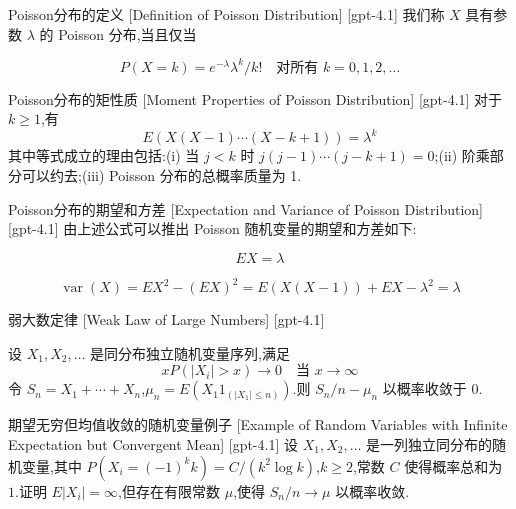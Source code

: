 \documentclass[UTF8]{ctexart}
\begin{document}
    
    
    \begin{dfn}
        {Poisson分布的定义}
        [Definition of Poisson Distribution]
        [gpt-4.1]
        我们称 $X$ 具有参数 $\lambda$ 的 Poisson 分布,当且仅当

\[
P(X = k) = e^{-\lambda} \lambda^{k} / k! \quad \text{对所有 } k = 0, 1, 2, \ldots
\]

    \end{dfn}
    
    
    
    \begin{ppt}
        {Poisson分布的矩性质}
        [Moment Properties of Poisson Distribution]
        [gpt-4.1]
        对于 $k \geq 1$,有
\[
E ( X ( X - 1 ) \cdots ( X - k + 1 ) ) = \lambda^{k}
\]
其中等式成立的理由包括:(i) 当 $j < k$ 时 $j ( j - 1 ) \cdots ( j - k + 1 ) = 0$;(ii) 阶乘部分可以约去;(iii) Poisson 分布的总概率质量为 1.

    \end{ppt}
    
    
    
    \begin{ppt}
        {Poisson分布的期望和方差}
        [Expectation and Variance of Poisson Distribution]
        [gpt-4.1]
        由上述公式可以推出 Poisson 随机变量的期望和方差如下:

\[
E X = \lambda
\]

\[
\operatorname{var}(X) = E X^{2} - \left(E X\right)^{2} = E ( X ( X - 1 ) ) + E X - \lambda^{2} = \lambda
\]

    \end{ppt}
    
    
    
    \begin{thm}
        {弱大数定律}
        [Weak Law of Large Numbers]
        [gpt-4.1]
        
设 $X_{1}, X_{2}, \dots$ 是同分布独立随机变量序列,满足
\[
x P( | X_{i} | > x ) \to 0 \quad \text{当 } x \to \infty
\]
令 $S_{n} = X_{1} + \cdots + X_{n}$,$\mu_{n} = E( X_{1} 1_{( | X_{1} | \leq n )} )$.则 $S_{n} / n - \mu_{n}$ 以概率收敛于 0.

    \end{thm}
    
    
    
    \begin{xmp}
        {期望无穷但均值收敛的随机变量例子}
        [Example of Random Variables with Infinite Expectation but Convergent Mean]
        [gpt-4.1]
        设 $X_1, X_2, \dots$ 是一列独立同分布的随机变量,其中 $P(X_i = (-1)^k k) = C / (k^2 \log k)$,$k \geq 2$,常数 $C$ 使得概率总和为 $1$.证明 $E|X_i| = \infty$,但存在有限常数 $\mu$,使得 $S_n / n \to \mu$ 以概率收敛.
    \end{xmp}
    
\end{document}
